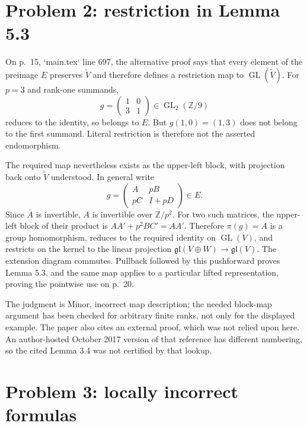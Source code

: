 \documentclass[10pt]{article}
\begin{document}
\section*{Problem 2: restriction in Lemma 5.3}
On p. 15, `main.tex` line 697, the alternative proof says that every element of the preimage \(E\) preserves \(\widetilde V\) and therefore defines a restriction map to \(\mathop{\mathrm{GL}}(\widetilde V)\). For \(p=3\) and rank-one summands, \[g=\begin{pmatrix}1&0\\3&1\end{pmatrix}\in\mathop{\mathrm{GL}}_2(\mathbb Z/9)\] reduces to the identity, so belongs to \(E\). But \(g(1,0)=(1,3)\) does not belong to the first summand. Literal restriction is therefore not the asserted endomorphism.\par
The required map nevertheless exists as the upper-left block, with projection back onto \(\widetilde V\) understood. In general write \[g=\begin{pmatrix}A&pB\\pC&I+pD\end{pmatrix}\in E.\] Since \(\bar A\) is invertible, \(A\) is invertible over \(\mathbb Z/p^2\). For two such matrices, the upper-left block of their product is \(AA'+p^2BC'=AA'\). Therefore \(\pi(g)=A\) is a group homomorphism, reduces to the required identity on \(\mathop{\mathrm{GL}}(V)\), and restricts on the kernel to the linear projection \(\mathfrak{gl}(V\oplus W)\to\mathfrak{gl}(V)\). The extension diagram commutes. Pullback followed by this pushforward proves Lemma 5.3, and the same map applies to a particular lifted representation, proving the pointwise use on p. 20.\par
The judgment is Minor, incorrect map description; the needed block-map argument has been checked for arbitrary finite ranks, not only for the displayed example. The paper also cites an external proof, which was not relied upon here. An author-hosted October 2017 version of that reference has different numbering, so the cited Lemma 3.4 was not certified by that lookup.\par
\section*{Problem 3: locally incorrect formulas}
\end{document}
